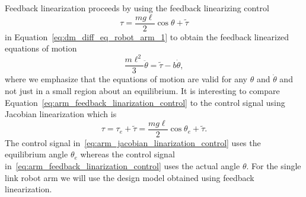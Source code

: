 Feedback linearization proceeds by using the feedback linearizing control
\begin{equation}\label{eq:arm_feedback_linarization_control}
\tau = \frac{mg\ell}{2}\cos\theta + \tilde{\tau}
\end{equation}
in Equation~\eqref{eq:dm_diff_eq_robot_arm_1} to obtain the feedback linearized equations of motion
\begin{equation}\label{eq:arm_linearized_eom_feedback_linarization}
\frac{m\ell^2}{3}\ddot{\theta} = \tilde{\tau} - b\dot{\theta},
\end{equation}
where we emphasize that the equations of motion are valid for any $\theta$ and $\dot{\theta}$ and not just in a small region about an equilibrium.  It is interesting to compare Equation~\eqref{eq:arm_feedback_linarization_control} to the control signal using Jacobian linearization which is
\begin{equation}\label{eq:arm_jacobian_linarization_control}
\tau = \tau_e+\tilde{\tau} = \frac{mg\ell}{2}\cos\theta_e + \tilde{\tau}.
\end{equation}
The control signal in~\eqref{eq:arm_jacobian_linarization_control} uses the equilibrium angle $\theta_e$ whereas the control signal in~\eqref{eq:arm_feedback_linarization_control} uses the actual angle $\theta$.  For the single link robot arm we will use the design model obtained using feedback linearization.

